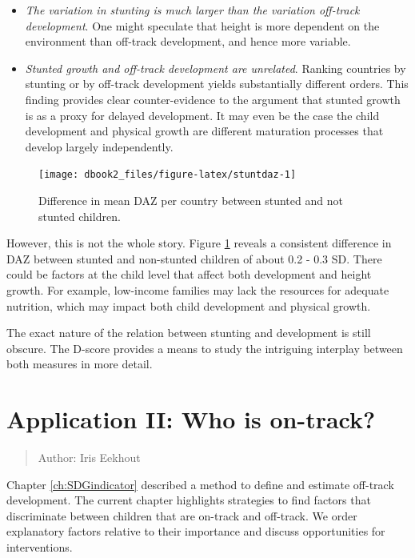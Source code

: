 \documentclass[
]{book}
\providecommand{\tightlist}{%
  \setlength{\itemsep}{0pt}\setlength{\parskip}{0pt}}
\begin{document}
\begin{itemize}
\tightlist
\item
  \emph{The variation in stunting is much larger than the variation off-track development}. One might speculate that height is more dependent on the environment than off-track development, and hence more variable.
\item
  \emph{Stunted growth and off-track development are unrelated}. Ranking countries by stunting or by off-track development yields substantially different orders. This finding provides clear counter-evidence to the argument that stunted growth is as a proxy for delayed development. It may even be the case the child development and physical growth are different maturation processes that develop largely independently.
\end{itemize}

\begin{figure}

{\centering \texttt{[image: dbook2\_files/figure-latex/stuntdaz-1]} 

}

\caption{Difference in mean DAZ per country between stunted and not stunted children.}\label{fig:stuntdaz}
\end{figure}



However, this is not the whole story. Figure \ref{fig:stuntdaz} reveals a consistent difference in DAZ between stunted and non-stunted children of about 0.2 - 0.3 SD. There could be factors at the child level that affect both development and height growth. For example, low-income families may lack the resources for adequate nutrition, which may impact both child development and physical growth.

The exact nature of the relation between stunting and development is still obscure. The D-score provides a means to study the intriguing interplay between both measures in more detail.

\hypertarget{ch:ontrack}{%
\chapter{Application II: Who is on-track?}\label{ch:ontrack}}

\begin{quote}
Author: Iris Eekhout
\end{quote}

Chapter \ref{ch:SDGindicator} described a method to define and estimate off-track development. The current chapter highlights strategies to find factors that discriminate between children that are on-track and off-track. We order explanatory factors relative to their importance and discuss opportunities for interventions.
\end{document}
